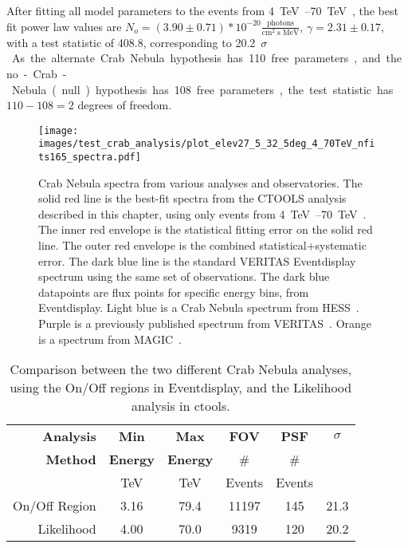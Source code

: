   After fitting all model parameters to the events from \SIrange{4}{70}{\TeV{}}, the best fit power law values are $ N_o = \left(3.90\pm0.71\right)*10^{-20} \frac{\textrm{photons}}{\textrm{cm}^{2} \; \textrm{s} \; \textrm{MeV} } $, $ \gamma = 2.31 \pm 0.17 $, with a test statistic of 408.8, corresponding to \nicetilde{}\SI{20.2}{$\sigma$}.
  As the alternate Crab Nebula hypothesis has 110 free parameters, and the no-Crab-Nebula (null) hypothesis has 108 free parameters, the test statistic has $ 110 - 108 = 2 $ degrees of freedom.
  
  \begin{figure}[!t]
    \centering
    \texttt{[image: images/test\_crab\_analysis/plot\_elev27\_5\_32\_5deg\_4\_70TeV\_nfits165\_spectra.pdf]}
    \caption[Crab Nebula Spectra]
    {
      Crab Nebula spectra from various analyses and observatories.
      The solid red line is the best-fit spectra from the CTOOLS analysis described in this chapter, using only events from \SIrange{4}{70}{\TeV{}}.
      The inner red envelope is the statistical fitting error on the solid red line.
      The outer red envelope is the combined statistical+systematic error.
      The dark blue line is the standard VERITAS Eventdisplay spectrum using the same set of observations.
      The dark blue datapoints are flux points for specific energy bins, from Eventdisplay.
      Light blue is a Crab Nebula spectrum from HESS~\cite{hess2006crab}.
      Purple is a previously published spectrum from VERITAS~\cite{veritas2015crab}.
      Orange is a spectrum from MAGIC~\cite{magic2015crab}.
    }
    \label{fig:crab_test_spectra}
  \end{figure}
    
  \begin{table}[!t]
    \centering
    \begin{tabular}{|r|c|c|c|c|c|}
      \hline
      \textbf{Analysis} & \textbf{Min}    & \textbf{Max}    & \textbf{FOV} & \textbf{PSF} & \textbf{$\sigma$} \\
      \textbf{Method}   & \textbf{Energy} & \textbf{Energy} &  \#          & \#           &                   \\
                        & TeV             & TeV             &  Events      & Events       &                   \\
      \hline 
      On/Off Region & 3.16 & 79.4 & 11197 & 145 & 21.3 \\
      Likelihood    & 4.00 & 70.0 & 9319  & 120 & 20.2 \\
      \hline 
    \end{tabular}
    \caption[Analysis Comparison]{
      Comparison between the two different Crab Nebula analyses, using the On/Off regions in Eventdisplay, and the Likelihood analysis in ctools.
    }
    \label{tab:crab_statistics}
  \end{table}

